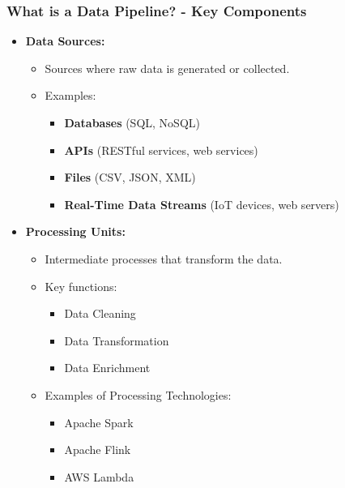 \documentclass[aspectratio=169]{beamer}
\begin{document}
\begin{frame}[fragile]
    \frametitle{What is a Data Pipeline? - Key Components}
    \begin{itemize}
        \item \textbf{Data Sources:}
            \begin{itemize}
                \item Sources where raw data is generated or collected.
                \item Examples:
                    \begin{itemize}
                        \item \textbf{Databases} (SQL, NoSQL)
                        \item \textbf{APIs} (RESTful services, web services)
                        \item \textbf{Files} (CSV, JSON, XML)
                        \item \textbf{Real-Time Data Streams} (IoT devices, web servers)
                    \end{itemize}
            \end{itemize}
        
        \item \textbf{Processing Units:}
            \begin{itemize}
                \item Intermediate processes that transform the data.
                \item Key functions:
                    \begin{itemize}
                        \item Data Cleaning
                        \item Data Transformation
                        \item Data Enrichment
                    \end{itemize}
                \item Examples of Processing Technologies:
                    \begin{itemize}
                        \item Apache Spark
                        \item Apache Flink
                        \item AWS Lambda
                    \end{itemize}
            \end{itemize}
        

\end{itemize}
\end{frame}
\end{document}
